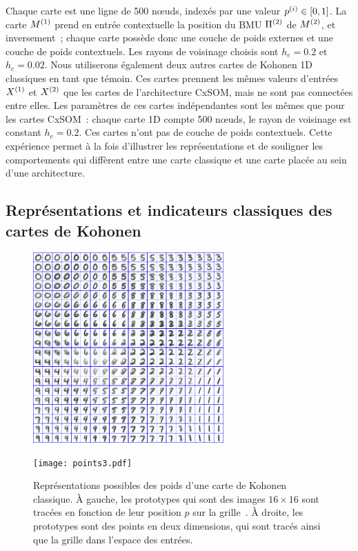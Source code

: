 \documentclass[../main]{subfiles}
\begin{document}
Chaque carte est une ligne de 500 n\oe{}uds, indexés par une valeur $p^{({i})} \in [0,1]$.
La carte $M^{({1})}$ prend en entrée contextuelle la position du BMU $\Pi^{({2})}$ de $M^{({2})}$, et inversement~; chaque carte possède donc une couche de poids externes et une couche de poids contextuels. Les rayons de voisinage choisis sont $h_e = 0.2$ et $h_c = 0.02$.
Nous utiliserons également deux autres cartes de Kohonen 1D classiques en tant que témoin.
Ces cartes prennent les mêmes valeurs d'entrées $X^{({1})}$ et $X^{({2})}$ que les cartes de l'architecture CxSOM, mais ne sont pas connectées entre elles. 
Les paramètres de ces cartes indépendantes sont les mêmes que pour les cartes CxSOM~: chaque carte 1D compte 500 n\oe{}uds, le rayon de voisinage est constant $h_e = 0.2$. Ces cartes n'ont pas de couche de poids contextuels.
Cette expérience permet à la fois d'illustrer les représentations et de souligner les comportements qui diffèrent entre une carte classique et une carte placée au sein d'une architecture.



\subsection{Représentations et indicateurs classiques des cartes de Kohonen}
\begin{figure}[t]
    \begin{minipage}{0.5\textwidth}
    \centering
    \includegraphics[width=0.65\textwidth]{digits.jpg}
    \end{minipage}
    \begin{minipage}{0.5\textwidth}
    \centering
    \texttt{[image: points3.pdf]}
    \end{minipage}
    \caption[Représentations classiques des poids d'une carte de Kohonen]{\label{fig:representation} Représentations possibles des poids d'une carte de Kohonen classique. \`A gauche, les prototypes qui sont des images $16\times 16$ sont tracées en fonction de leur position $p$ sur la grille~\footnotemark[1]. \`A droite, les prototypes sont des points en deux dimensions, qui sont tracés ainsi que la grille dans l'espace des entrées.}
    \end{figure}
\end{document}
